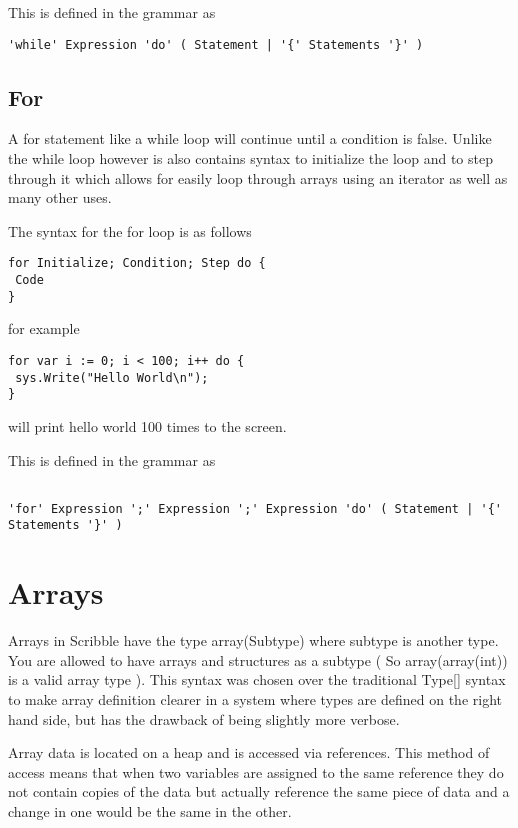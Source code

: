 \documentclass[]{final_report}
\begin{document}
This is defined in the grammar as

\begin{verbatim}
'while' Expression 'do' ( Statement | '{' Statements '}' )
\end{verbatim}

\subsection{For}

A for statement like a while loop will continue until a condition is false. Unlike the while loop however is also contains syntax to initialize the loop and to step through it which allows for easily loop through arrays using an iterator as well as many other uses.

The syntax for the for loop is as follows

\begin{verbatim}
for Initialize; Condition; Step do {
 Code
}
\end{verbatim}

for example

\begin{verbatim}
for var i := 0; i < 100; i++ do {
 sys.Write("Hello World\n");
}
\end{verbatim}

will print hello world 100 times to the screen.

This is defined in the grammar as 

\begin{verbatim}

'for' Expression ';' Expression ';' Expression 'do' ( Statement | '{' Statements '}' )

\end{verbatim}

\section{Arrays}

Arrays in Scribble have the type array(Subtype) where subtype is another type. You are allowed to have arrays and structures as a subtype ( So array(array(int)) is a valid array type ). This syntax was chosen over the traditional Type[] syntax to make array definition clearer in a system where types are defined on the right hand side, but has the drawback of being slightly more verbose. 

Array data is located on a heap and is accessed via references. This method of access means that when two variables are assigned to the same reference they do not contain copies of the data but actually reference the same piece of data and a change in one would be the same in the other.
\end{document}
